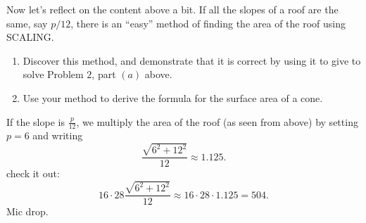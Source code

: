 \documentclass[hints,nooutcomes,noauthor,handout,12pt]{ximera}
\begin{document}
\mynewpage


\begin{question}
  Now let's reflect on the content above a bit. If all the slopes of a
  roof are the same, say $p/12$, there is an ``easy'' method of
  finding the area of the roof using SCALING.
  \begin{enumerate}
    \item Discover this method, and demonstrate that it is correct by using
    it to give to solve Problem $2$, part $(a)$ above.
    \item Use your method to derive the formula for the surface area
      of a cone. 
  \end{enumerate}
  \begin{freeResponse}
  If the slope is $\frac{p}{12}$, we multiply the area of the roof (as
  seen from above) by setting $p = 6$ and writing
    \[
    \frac{\sqrt{6^2+12^2}}{12} \approx 1.125.
    \]
    check it out:
    \[
    16\cdot 28 \frac{\sqrt{6^2+12^2}}{12} \approx 16\cdot 28 \cdot 1.125 = 504.
    \]
    Mic drop.
  \end{freeResponse}
\end{question}
\end{document}
